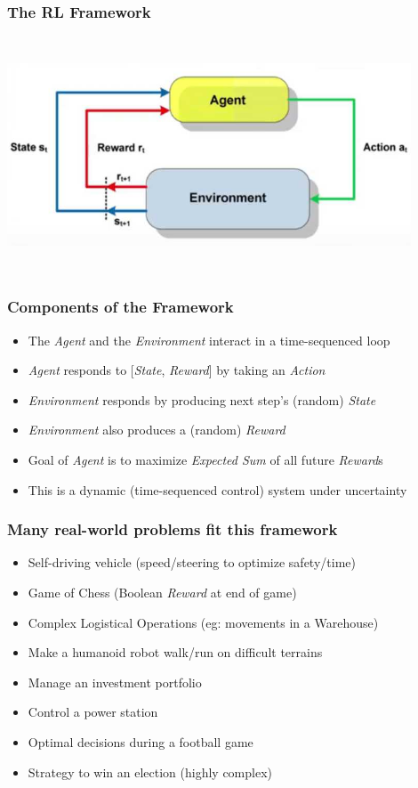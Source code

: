 \documentclass{beamer}
\begin{document}
\begin{frame}
\frametitle{The RL Framework}
\begin{center}
\includegraphics[width=12cm, height=7cm]{RL_diagram.jpg}
\end{center}
\end{frame}

\begin{frame}
\frametitle{Components of the Framework}
\pause
\begin{itemize}[<+->]
\item The {\em Agent} and the {\em Environment} interact in a time-sequenced loop
\item {\em Agent} responds to [{\em State}, {\em Reward}] by taking an {\em Action}
\item {\em Environment} responds by producing next step's (random) {\em State}
\item {\em Environment} also produces a (random) {\em Reward}
\item Goal of {\em Agent} is to maximize {\em Expected Sum} of all future {\em Reward}s
\item This is a dynamic (time-sequenced control) system under uncertainty
\end{itemize}
\end{frame}

\begin{frame}
\frametitle{Many real-world problems fit this framework}
\pause
\begin{itemize}[<+->]
\item Self-driving vehicle (speed/steering to optimize safety/time)
\item Game of Chess (Boolean {\em Reward} at end of game)
\item Complex Logistical Operations (eg: movements in a Warehouse)
\item Make a humanoid robot walk/run on difficult terrains
\item Manage an investment portfolio
\item Control a power station
\item Optimal decisions during a football game
\item Strategy to win an election (highly complex)
\end{itemize}
\end{frame}
\end{document}
